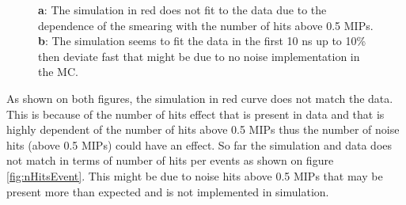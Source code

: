 \documentclass[twoside,a4paper,11pt]{article}
\begin{document}
\begin{figure}[htbp]
	\hfill
	\caption[]{\textbf{a}: The simulation in red does not fit to the data due to the dependence of the smearing with the number of hits above 0.5 MIPs. \textbf{b}: The simulation seems to fit the data in the first 10 ns up to 10\% then deviate fast that might be due to no noise implementation in the MC.}
	\label{fig:sim_data_elec}
\end{figure}
As shown on both figures, the simulation in red curve does not match the data. This is because of the number of hits effect that is present in data and that is highly dependent of the number of hits above 0.5 MIPs thus the number of noise hits (above 0.5 MIPs) could have an effect. So far the simulation and data does not match in terms of number of hits per events as shown on figure \ref{fig:nHitsEvent}. This might be due to noise hits above 0.5 MIPs that may be present more than expected and is not implemented in simulation.
\end{document}
